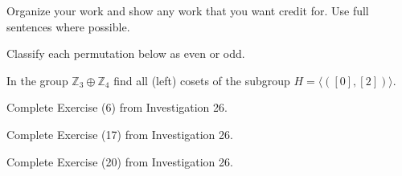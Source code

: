 \documentclass[addpoints]{exam}
\begin{document}
Organize your work and show any work that you want credit for. Use full sentences where possible.

\begin{questions}
\question 
Classify each permutation below as even or odd.

\question 
In the group $\mathbb{Z}_3\oplus\mathbb{Z}_4$ find all (left) cosets of the subgroup $H=\langle ([0],[2])\rangle$.

\question 
Complete Exercise (6) from Investigation 26.

\question 
Complete Exercise (17) from Investigation 26.

\question 
Complete Exercise (20) from Investigation 26.








\end{questions}
\end{document}
